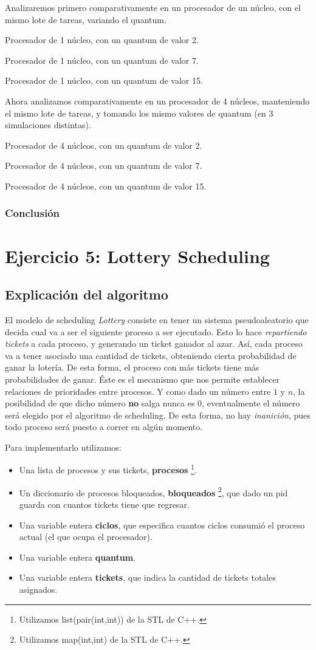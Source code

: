 \documentclass[a4paper]{article}
\begin{document}
Analizaremos primero comparativamente en un procesador de un núcleo, con el
mismo lote de tareas, variando el quantum.

Procesador de 1 núcleo, con un quantum de valor 2.

Procesador de 1 núcleo, con un quantum de valor 7.

Procesador de 1 núcleo, con un quantum de valor 15.

Ahora analizamos comparativamente en un procesador de 4 núcleos, manteniendo
el mismo lote de tareas, y tomando los mismo valores de quantum (en 3
simulaciones distintas).

Procesador de 4 núcleos, con un quantum de valor 2.

Procesador de 4 núcleos, con un quantum de valor 7.

Procesador de 4 núcleos, con un quantum de valor 15.

\subsubsection{Conclusión}

\section{Ejercicio 5: Lottery Scheduling}
\subsection{Explicación del algoritmo}
El modelo de scheduling \textit{Lottery} consiste en tener un sistema
pseudoaleatorio que decida cual va a ser el siguiente proceso a ser
ejecutado. Esto lo hace \textit{repartiendo tickets} a cada proceso, y
generando un ticket ganador al azar. Así, cada
proceso va a tener asociado una cantidad de tickets, obteniendo
cierta probabilidad de ganar la lotería. De esta forma, el proceso con más
tickets tiene más probabilidades de ganar. Éste es el mecanismo que nos
permite establecer relaciones de prioridades entre procesos.
Y como dado un número entre $1$ y $n$, la posibilidad de que dicho número
\textbf{no} salga nunca es $0$, eventualmente el número será elegido por el
algoritmo de scheduling. De esta forma, no hay \textit{inanición}, pues
todo proceso será puesto a correr en algún momento.

Para implementarlo utilizamos:
\begin{itemize}
\item Una lista de procesos y sus tickets, \textbf{procesos}
\footnote{Utilizamos list(pair(int,int)) de la STL de C++.}.
\item Un diccionario de procesos bloqueados, \textbf{bloqueados}
\footnote{Utilizamos map(int,int) de la STL de C++.}, que dado un pid guarda con cuantos
tickets tiene que regresar.
\item Una variable entera \textbf{ciclos}, que especifica cuantos ciclos
consumió el proceso actual (el que ocupa el procesador).
\item Una variable entera \textbf{quantum}.
\item Una variable entera \textbf{tickets}, que indica la cantidad de
tickets totales asignados.
\end{itemize}
\end{document}
